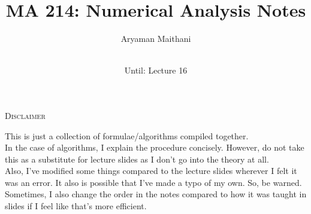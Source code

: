 \documentclass[12pt]{article}
\title{MA 214: Numerical Analysis Notes}
\author{Aryaman Maithani}
\date{\DTMnow\\
Until: Lecture 16}
\theoremstyle{definition}
\begin{document}
\maketitle
\begin{center}
	\textsc{Disclaimer}
\end{center}
This is just a collection of formulae/algorithms compiled together.\\
In the case of algorithms, I explain the procedure concisely. However, do not take this as a substitute for lecture slides as I don't go into the theory at all.\\
Also, I've modified some things compared to the lecture slides wherever I felt it was an error. It also is possible that I've made a typo of my own. So, be warned.\\
Sometimes, I also change the order in the notes compared to how it was taught in slides if I feel like that's more efficient.

\hrulefill
\end{document}
